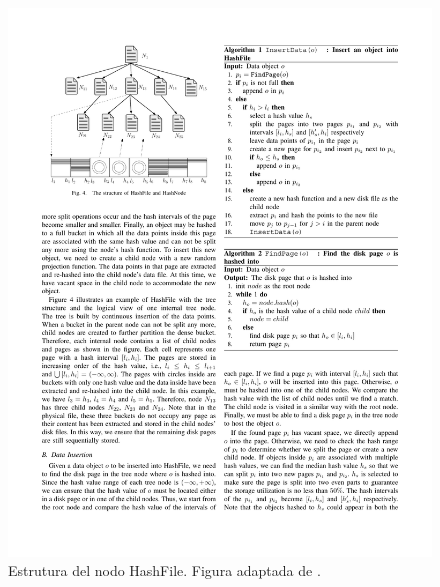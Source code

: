 \begin{figure}[h]
\centering
 \includegraphics[width=0.65\columnwidth]{chapter2/hashfilestructure.pdf}
\caption{Estrutura del nodo HashFile. Figura adaptada de \cite{lshHashFile}.}
\label{fig:HashFile_structure}
\end{figure}

